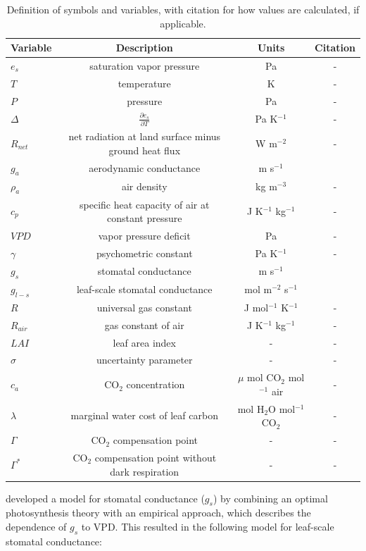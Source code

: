 \documentclass[draft,linenumbers]{agujournal}
\begin{document}
\begin{table}
  \caption{Definition of symbols and variables, with citation for how values are calculated, if applicable.}
  \label{definitions}
\centering
\small
\begin{tabular}{l c c c}
\hline
 Variable & Description & Units & Citation \\
\hline
$e_s$  & saturation vapor pressure & Pa  & - \\ 
  $T$  & temperature  & K & - \\
  $P$  & pressure & Pa  & - \\
$\Delta$  & $\frac{\partial e_s}{\partial T}$ & Pa K$^{-1}$ & - \\
$R_{net}$  & net radiation at land surface minus ground heat flux & W m$^{-2}$   & - \\
  $g_a$  & aerodynamic conductance & m s$^{-1}$  & \citet{Shuttleworth_2012} \\
  $\rho_a$  & air density & kg m$^{-3}$  & - \\
  $c_p$  & specific heat capacity of air at constant pressure & J K$^{-1}$ kg$^{-1}$ & - \\
  $VPD$  & vapor pressure deficit & Pa  & - \\
  $\gamma$  & psychometric constant & Pa K$^{-1}$   & - \\
  $g_s$  & stomatal conductance & m s$^{-1}$  & \citet{MEDLYN_2011} \\
  $g_{l-s}$  & leaf-scale stomatal conductance & mol m$^{-2}$ s$^{-1}$  & \citet{MEDLYN_2011} \\
  $R$ & universal gas constant & J mol$^{-1}$ K$^{-1}$ & - \\
  $R_{air}$ & gas constant of air & J  K$^{-1}$ kg$^{-1}$ & - \\
  $LAI$ & leaf area index & -& - \\
  $\sigma$ & uncertainty parameter & -& - \\
  $c_a$ & CO$_2$ concentration & $\mu$ mol CO$_2$ mol$^{-1}$ air& - \\
  $\lambda$ & marginal water cost of leaf carbon & mol H$_2$O mol$^{-1}$ CO$_2$ & - \\
  $\Gamma$ & CO$_2$ compensation point & - & - \\
  $\Gamma^*$ & CO$_2$ compensation point without dark respiration & - & - \\
\hline
\end{tabular}
\end{table}


\citet{MEDLYN_2011} developed a model for stomatal conductance ($g_s$) by combining an optimal photosynthesis theory \citep{Farquhar_1980, Katul_2010} with an empirical approach, which describes the dependence of $g_s$ to VPD. This resulted in the following model for leaf-scale stomatal conductance:
\end{document}
